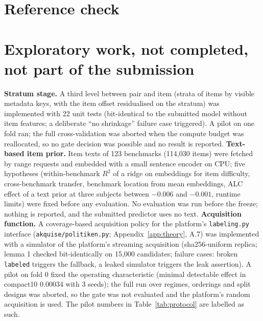 \documentclass{article}
\begin{document}


\section{Reference check}
\label{app:bib}


\section{Exploratory work, not completed, not part of the submission}
\label{app:explore}

\textbf{Stratum stage.} A third level between pair and item (strata of items by visible metadata keys, with the
item offset residualised on the stratum) was implemented with 22 unit tests (bit-identical to the submitted model
without item features; a deliberate ``no shrinkage'' failure case triggered). A pilot on one fold ran; the full
cross-validation was aborted when the compute budget was reallocated, so no gate decision was possible and no result
is reported. \textbf{Text-based item prior.} Item texts of 123 benchmarks (114,030 items) were fetched by range
requests and embedded with a small sentence encoder on CPU; five hypotheses (within-benchmark $R^2$ of a ridge on
embeddings for item difficulty, cross-benchmark transfer, benchmark location from mean embeddings, ALC effect of a
text prior at three subjects between $-0.006$ and $-0.001$, runtime limits) were fixed before any evaluation. No
evaluation was run before the freeze; nothing is reported, and the submitted predictor uses no text. \textbf{Acquisition
function.} A coverage-based acquisition policy for the platform's \texttt{labeling.py} interface (\texttt{akquise/politiken.py}; Appendix~\ref{app:theory}, A.7) was implemented with a simulator of
the platform's streaming acquisition (sha256-uniform replica; lemma 1 checked bit-identically on 15,000 candidates;
failure cases: broken \texttt{labeled} triggers the fallback, a leaked simulator triggers the leak assertion). A pilot on
fold 0 fixed the operating characteristic (minimal detectable effect in compact10 0.00034 with 3 seeds); the full run
over regimes, orderings and split designs was aborted, so the gate was not evaluated and the platform's random
acquisition is used. The pilot numbers in Table~\ref{tab:protocol} are labelled as such.
\end{document}
